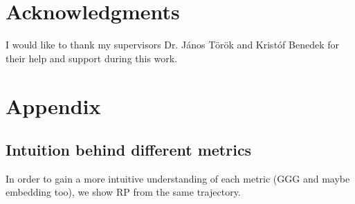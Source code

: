 \documentclass[a4paper,12pt]{article}
\begin{document}
\section{Acknowledgments }
\label{sec:acknowledgements}

I would like to thank my supervisors Dr. János Török and Kristóf Benedek for their help and support during this work.

\newpage



\section{Appendix}
\label{sec:appendix}

\subsection{Intuition behind different metrics}
\label{subsec:appendix_intuition_metrics}

In order to gain a more intuitive understanding of each metric (GGG and maybe embedding too), we show RP from the same trajectory.
\end{document}
